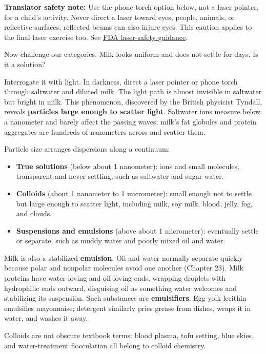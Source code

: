\textbf{Translator safety note:} Use the phone-torch option below, not a laser pointer, for a child's activity. Never direct a laser toward eyes, people, animals, or reflective surfaces; reflected beams can also injure eyes. This caution applies to the final laser exercise too. See \href{https://www.fda.gov/consumers/consumer-updates/laser-toys-how-keep-kids-safe}{FDA laser-safety guidance}.

Now challenge our categories. Milk looks uniform and does not settle for days. Is it a solution?

Interrogate it with light. In darkness, direct a laser pointer or phone torch through saltwater and diluted milk. The light path is almost invisible in saltwater but bright in milk. This phenomenon, discovered by the British physicist Tyndall, reveals \textbf{particles large enough to scatter light}. Saltwater ions measure below a nanometer and barely affect the passing waves; milk's fat globules and protein aggregates are hundreds of nanometers across and scatter them.

Particle size arranges dispersions along a continuum:

\begin{itemize}[itemsep=2pt]
\item \textbf{True solutions} (below about 1 nanometer): ions and small molecules, transparent and never settling, such as saltwater and sugar water.
\item \textbf{Colloids} (about 1 nanometer to 1 micrometer): small enough not to settle but large enough to scatter light, including milk, soy milk, blood, jelly, fog, and clouds.
\item \textbf{Suspensions and emulsions} (above about 1 micrometer): eventually settle or separate, such as muddy water and poorly mixed oil and water.
\end{itemize}

Milk is also a stabilized \textbf{emulsion}. Oil and water normally separate quickly because polar and nonpolar molecules avoid one another (Chapter 23). Milk proteins have water-loving and oil-loving ends, wrapping droplets with hydrophilic ends outward, disguising oil as something water welcomes and stabilizing its suspension. Such substances are \textbf{emulsifiers}. Egg-yolk lecithin emulsifies mayonnaise; detergent similarly pries grease from dishes, wraps it in water, and washes it away.

Colloids are not obscure textbook terms: blood plasma, tofu setting, blue skies, and water-treatment flocculation all belong to colloid chemistry.

